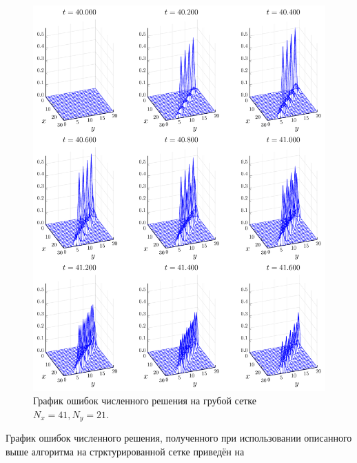 \begin{figure}
    \centering
    \includegraphics[width=\textwidth, height=\textheight, keepaspectratio]{Теория_блочных_локально_адаптивных_сеток/Результаты_моделирования/errors_before.pdf}
    \caption{График ошибок численного решения на грубой сетке $N_x = 41, N_y = 21$.}
    \label{fig:coarse_errors}
\end{figure}
График ошибок численного решения, полученного при использовании описанного выше алгоритма на стрктурированной сетке приведён на 
